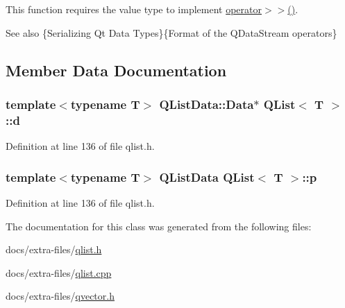 This function requires the value type to implement {\ttfamily \hyperlink{class_q_list_ab4ba1c178d4cab8a72ef68798eaefabc}{operator$>$$>$()}}.

\begin{DoxySeeAlso}{See also}
\{Serializing Qt Data Types\}\{Format of the Q\+Data\+Stream operators\} 
\end{DoxySeeAlso}


\subsection{Member Data Documentation}
\subsubsection[{\texorpdfstring{d}{d}}]{\setlength{\rightskip}{0pt plus 5cm}template$<$typename T$>$ {\bf Q\+List\+Data\+::\+Data}$\ast$ {\bf Q\+List}$<$ T $>$\+::d}\hypertarget{class_q_list_a0abacfae13771c5af1356a5e42c7703c}{}\label{class_q_list_a0abacfae13771c5af1356a5e42c7703c}


Definition at line 136 of file qlist.\+h.

\subsubsection[{\texorpdfstring{p}{p}}]{\setlength{\rightskip}{0pt plus 5cm}template$<$typename T$>$ {\bf Q\+List\+Data} {\bf Q\+List}$<$ T $>$\+::p}\hypertarget{class_q_list_a888da6d032fd3682090650b1d63ee741}{}\label{class_q_list_a888da6d032fd3682090650b1d63ee741}


Definition at line 136 of file qlist.\+h.



The documentation for this class was generated from the following files\+:\begin{DoxyCompactItemize}
\item 
docs/extra-\/files/\hyperlink{qlist_8h}{qlist.\+h}\item 
docs/extra-\/files/\hyperlink{qlist_8cpp}{qlist.\+cpp}\item 
docs/extra-\/files/\hyperlink{qvector_8h}{qvector.\+h}\end{DoxyCompactItemize}
